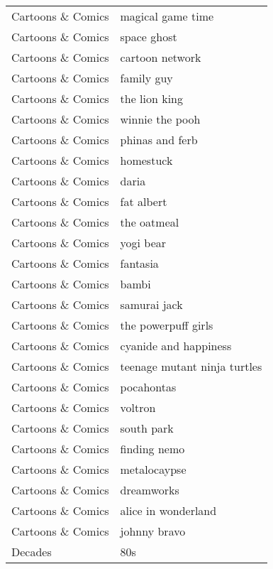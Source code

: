 \begin{supertabular}{l p{0.25\textwidth}}
Cartoons \& Comics &                  magical game time \\
Cartoons \& Comics &                        space ghost \\
Cartoons \& Comics &                    cartoon network \\
Cartoons \& Comics &                         family guy \\
Cartoons \& Comics &                      the lion king \\
Cartoons \& Comics &                    winnie the pooh \\
Cartoons \& Comics &                    phinas and ferb \\
Cartoons \& Comics &                          homestuck \\
Cartoons \& Comics &                              daria \\
Cartoons \& Comics &                         fat albert \\
Cartoons \& Comics &                        the oatmeal \\
Cartoons \& Comics &                          yogi bear \\
Cartoons \& Comics &                           fantasia \\
Cartoons \& Comics &                              bambi \\
Cartoons \& Comics &                       samurai jack \\
Cartoons \& Comics &                the powerpuff girls \\
Cartoons \& Comics &              cyanide and happiness \\
Cartoons \& Comics &       teenage mutant ninja turtles \\
Cartoons \& Comics &                         pocahontas \\
Cartoons \& Comics &                            voltron \\
Cartoons \& Comics &                         south park \\
Cartoons \& Comics &                       finding nemo \\
Cartoons \& Comics &                       metalocaypse \\
Cartoons \& Comics &                         dreamworks \\
Cartoons \& Comics &                alice in wonderland \\
Cartoons \& Comics &                       johnny bravo \\
          Decades &                                80s \\

\end{supertabular}
